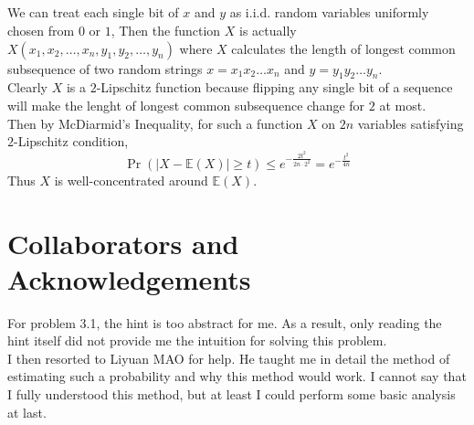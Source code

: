 \documentclass[12pt,letterpaper]{article}
\begin{document}
\subsection{}
We can treat each single bit of $x$ and $y$ as i.i.d. random variables uniformly chosen from $0$ or $1$,
Then the function $X$ is actually $X(x_1,x_2,\dots,x_n,y_1,y_2,\dots,y_n)$
where $X$ calculates the length of longest common subsequence of two random strings 
$x=x_1x_2\dots x_n$ and $y=y_1y_2\dots y_n$.\\
Clearly $X$ is a $2$-Lipschitz function because flipping any single bit of a sequence 
will make the lenght of longest common subsequence change for $2$ at most.\\
Then by McDiarmid's Inequality,
for such a function $X$ on $2n$ variables satisfying $2$-Lipschitz condition,
$$\Pr(|X-\mathbb{E}(X)|\geq t)\leq e^{-\frac{2t^2}{2n\cdot2^2}}=e^{-\frac{t^2}{4n}}$$
Thus $X$ is well-concentrated around $\mathbb{E}(X)$.  
\section{Collaborators and Acknowledgements}
For problem 3.1, the hint is too abstract for me.
As a result, only reading the hint itself did not provide me 
the intuition for solving this problem.\\
I then resorted to Liyuan MAO for help.
He taught me in detail the method of estimating such a probability
and why this method would work.
I cannot say that I fully understood this method,
but at least I could perform some basic analysis at last.
\end{document}
